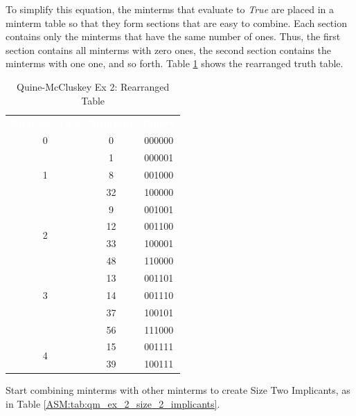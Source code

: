 To simplify this equation, the minterms that evaluate to \emph{True} are placed in a minterm table so that they form sections that are easy to combine. Each section contains only the minterms that have the same number of ones. Thus, the first section contains all minterms with zero ones, the second section contains the minterms with one one, and so forth. Table \ref{ASM:tab:qm_ex_2_rearranged_table} shows the rearranged truth table.

\begin{table}[H]
	\sffamily
	\newcommand{\head}[1]{\textcolor{white}{\textbf{#1}}}		
	\begin{center}
		\begin{tabular}{ccc} 
			\rowcolor{black!75}
			\head{Number of 1's} & \head{Minterm} & \head{Binary} \\
							 0 & 0  & 000000 \\
			\hline
			\multirow{3}{*}{1} & 1  & 000001 \\
                               & 8  & 001000 \\
                               & 32 & 100000 \\
 			\hline
			\multirow{4}{*}{2} & 9  & 001001 \\
                               & 12 & 001100 \\		
							   & 33 & 100001 \\		
							   & 48 & 110000 \\
			\hline
			\multirow{3}{*}{3} & 13 & 001101 \\
							   & 14 & 001110 \\		
							   & 37 & 100101 \\		
							   & 56 & 111000 \\
			\hline
			\multirow{2}{*}{4} & 15 & 001111 \\
							   & 39 & 100111 \\		
			\hline
		\end{tabular}
	\end{center}
	\caption{Quine-McCluskey Ex 2: Rearranged Table}
  \label{ASM:tab:qm_ex_2_rearranged_table}
\end{table}

Start combining minterms with other minterms to create Size Two Implicants, as in Table \ref{ASM:tab:qm_ex_2_size_2_implicants}.

